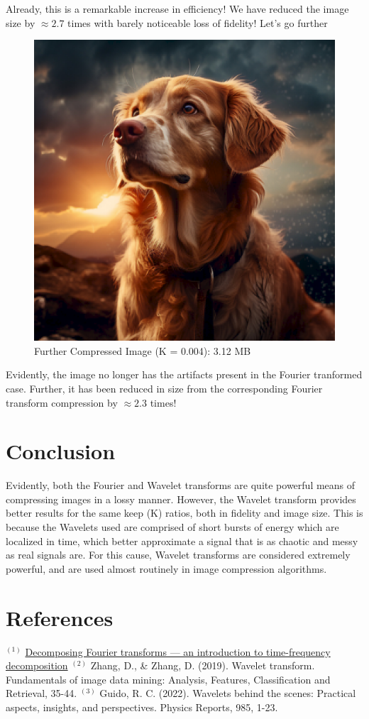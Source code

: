 \documentclass{article}
\begin{document}
Already, this is a remarkable increase in efficiency! We have reduced the image size by $\approx 2.7$ times with barely noticeable 
loss of fidelity! Let's go further
\begin{figure}[h]
    \centering
    \includegraphics[width=0.5\linewidth]{Images/wavelet-supercompressed-image.png}
    \caption{Further Compressed Image (K = 0.004): 3.12 MB}
    \label{fig:scwd}
\end{figure}
\newline
Evidently, the image no longer has the artifacts present in the Fourier tranformed case. Further, it has been 
reduced in size from the corresponding Fourier transform compression by $\approx 2.3$ times!

\newpage
\section*{Conclusion}
Evidently, both the Fourier and Wavelet transforms are quite powerful means of compressing images in a lossy manner. 
However, the Wavelet transform provides better results for the same keep (K) ratios, both in fidelity and image size.
This is because the Wavelets used are comprised of short bursts of energy which are localized in time, which better
approximate a signal that is as chaotic and messy as real signals are. For this cause, Wavelet transforms are considered
extremely powerful, and are used almost routinely in image compression algorithms.

\newpage
\section*{References}
$^{(1)}$ \href{https://dibsmethodsmeetings.github.io/fourier-transforms/}{Decomposing Fourier transforms — an introduction to time-frequency decomposition}
\newline \newline
$^{(2)}$ Zhang, D., \& Zhang, D. (2019). Wavelet transform. Fundamentals of image data mining: Analysis, Features, Classification and Retrieval, 35-44.
\newline \newline
$^{(3)}$ Guido, R. C. (2022). Wavelets behind the scenes: Practical aspects, insights, and perspectives. Physics Reports, 985, 1-23.
\end{document}
